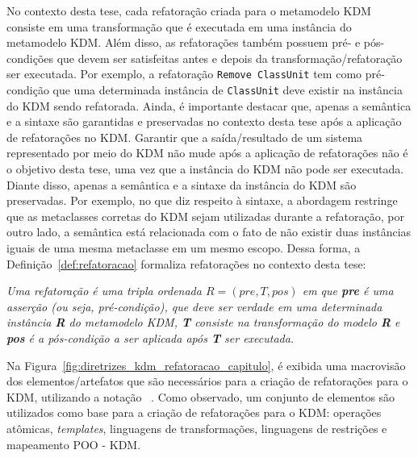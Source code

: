 No contexto desta tese, cada refatoração criada para o metamodelo KDM consiste em uma transformação que é executada em uma instância do metamodelo KDM. Além disso, as refatorações também possuem pré- e pós-condições que devem ser satisfeitas antes e depois da transformação/refatoração ser executada. Por exemplo, a refatoração \texttt{Remove ClassUnit} tem como pré-condição que uma determinada instância de \texttt{ClassUnit} deve existir na instância do KDM sendo refatorada. %
Ainda, é importante destacar que, apenas a semântica e a sintaxe são garantidas e preservadas no contexto desta tese após a aplicação de refatorações no KDM. Garantir que a saída/resultado de um sistema representado por meio do KDM não mude após a aplicação de refatorações não é o objetivo desta tese, uma vez que a instância do KDM não pode ser executada. Diante disso, apenas a semântica e a sintaxe da instância do KDM são preservadas. Por exemplo, no que diz respeito à sintaxe, a abordagem restringe que as metaclasses corretas do KDM sejam utilizadas durante a refatoração, por outro lado, a semântica está relacionada com o fato de não existir duas instâncias iguais de uma mesma metaclasse em um mesmo escopo. Dessa forma, a Definição~\ref{def:refatoracao} formaliza refatorações no contexto desta tese:


\begin{definicao}\label{def:refatoracao}
    \textit{Uma refatoração é uma tripla ordenada $R = (pre, T, pos)$ em que \textbf{pre} é uma asserção (ou seja, pré-condição), que deve ser verdade em uma determinada instância \textbf{R} do metamodelo KDM, \textbf{T} consiste na transformação do modelo \textbf{R} e \textbf{pos} é a pós-condição a ser aplicada após \textbf{T} ser executada.}
\end{definicao}


Na Figura~\ref{fig:diretrizes_kdm_refatoracao_capitulo}, é exibida uma macrovisão dos elementos/artefatos que são necessários para a criação de refatorações para o KDM, utilizando a notação ~\cite{Marca_1987}. Como observado, um conjunto de elementos são utilizados como base para a criação de refatorações para o KDM: operações atômicas, \textit{templates}, linguagens de transformações, linguagens de restrições e mapeamento POO - KDM. 

